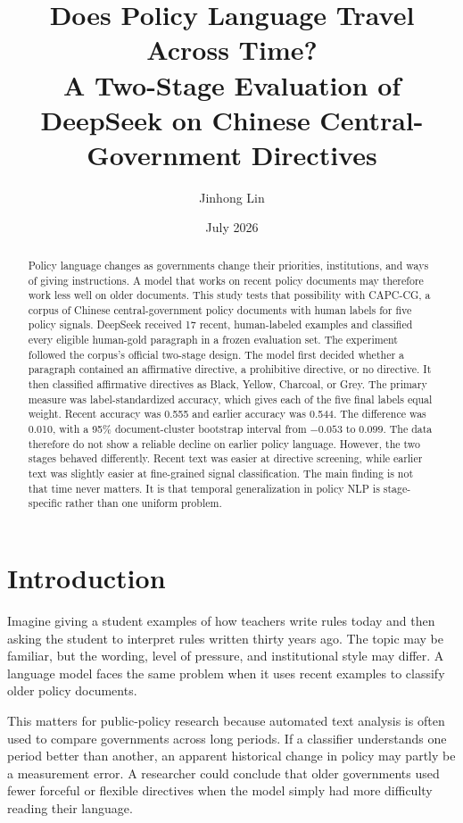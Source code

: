 \documentclass[11pt]{article}
\title{\textbf{Does Policy Language Travel Across Time?}\\
\large A Two-Stage Evaluation of DeepSeek on Chinese Central-Government Directives}
\author{Jinhong Lin}
\date{July 2026}
\begin{document}
\maketitle

\begin{abstract}
Policy language changes as governments change their priorities, institutions, and ways of giving instructions. A model that works on recent policy documents may therefore work less well on older documents. This study tests that possibility with CAPC-CG, a corpus of Chinese central-government policy documents with human labels for five policy signals. DeepSeek received 17 recent, human-labeled examples and classified every eligible human-gold paragraph in a frozen evaluation set. The experiment followed the corpus's official two-stage design. The model first decided whether a paragraph contained an affirmative directive, a prohibitive directive, or no directive. It then classified affirmative directives as Black, Yellow, Charcoal, or Grey. The primary measure was label-standardized accuracy, which gives each of the five final labels equal weight. Recent accuracy was 0.555 and earlier accuracy was 0.544. The difference was 0.010, with a 95\% document-cluster bootstrap interval from $-0.053$ to $0.099$. The data therefore do not show a reliable decline on earlier policy language. However, the two stages behaved differently. Recent text was easier at directive screening, while earlier text was slightly easier at fine-grained signal classification. The main finding is not that time never matters. It is that temporal generalization in policy NLP is stage-specific rather than one uniform problem.
\end{abstract}

\section{Introduction}

Imagine giving a student examples of how teachers write rules today and then asking the student to interpret rules written thirty years ago. The topic may be familiar, but the wording, level of pressure, and institutional style may differ. A language model faces the same problem when it uses recent examples to classify older policy documents.

This matters for public-policy research because automated text analysis is often used to compare governments across long periods. If a classifier understands one period better than another, an apparent historical change in policy may partly be a measurement error. A researcher could conclude that older governments used fewer forceful or flexible directives when the model simply had more difficulty reading their language.
\end{document}
